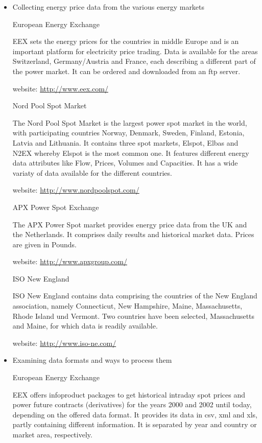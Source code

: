 \documentclass[a4paper]{article}
\begin{document}
\begin{itemize}
	
		

\item Collecting energy price data from the various energy markets

	\subitem European Energy Exchange
	
	EEX sets the energy prices for the countries in middle Europe and is an important platform for electricity price trading.  
	Data is available for the areas Switzerland, Germany/Austria and France, each describing a different part of the power market. It can be ordered and downloaded from an ftp server.
	
	website: \url{http://www.eex.com/}
	
	\subitem Nord Pool Spot Market
	
	The Nord Pool Spot Market is the largest power spot market in the world, with participating countries Norway, Denmark, Sweden, Finland, Estonia, Latvia and Lithuania. It contains three spot markets, Elspot, Elbas and N2EX  whereby Elspot is the most common one. It features different energy data attributes like Flow, Prices, Volumes and Capacities. It has a wide variaty of data available for the different countries. 
	
	website: \url{http://www.nordpoolspot.com/}
	
	\subitem APX Power Spot Exchange
	
The APX Power Spot market provides energy price data from the UK and the Netherlands. It comprises daily results and historical market data. Prices are given in Pounds. 

	website: \url{http://www.apxgroup.com/}

	\subitem ISO New England
	
	ISO New England contains data comprising the countries of the New England association, namely Connecticut, New Hampshire, Maine, Massachusetts, Rhode Island und Vermont. Two countries have been selected, Massachusetts and Maine, for which data is readily available. 
	
	website: \url{http://www.iso-ne.com/}

\item Examining data formats and ways to process them

	\subitem European Energy Exchange
	
	EEX offers infoproduct packages to get historical intraday spot prices and power future contracts (derivatives) for the years 2000 and 2002 until today, depending on the offered data format. 
	It provides its data in csv, xml and xls, partly containing different information. It is separated by year and country or market area, respectively. 
	


\end{itemize}
\end{document}
